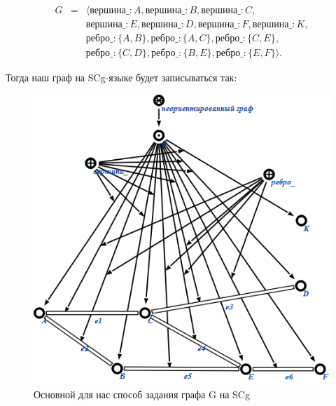\begin{eqnarray*}
  G &=& \langle вершина\_: A, вершина\_: B, вершина\_: C, \\
  && вершина\_: E, вершина\_: D, вершина\_: F, вершина\_: K, \\
  && ребро\_: \{A, B\}, ребро\_: \{A, C\}, ребро\_: \{C, E\}, \\
  && ребро\_: \{C, D\}, ребро\_: \{B, E\}, ребро\_: \{E, F\} \rangle.
\end{eqnarray*}

Тогда наш граф на SCg-языке будет записываться так:

\begin{figure}[h]
  \centering
  \includegraphics[scale=0.6]{images/2/Undirected_graph_Main_method}
  \caption{Основной для нас способ задания графа G на SCg}
  \label{fig:Undirected_graph_Main_method}
\end{figure}

